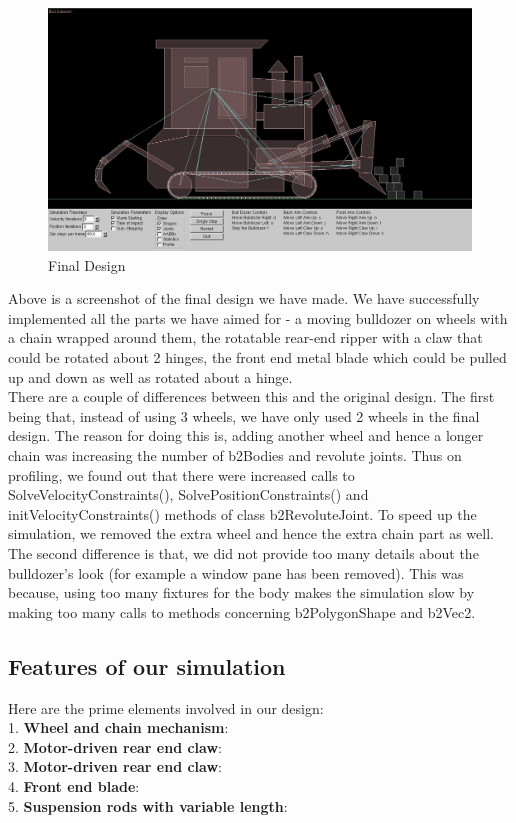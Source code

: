 \documentclass[11pt]{article}
\begin{document}
\begin{figure}
\centering 
\includegraphics [scale=0.3]{./images/final.jpg} 
\caption{Final Design}
\end{figure}
Above is a screenshot of the final design we have made. We have successfully implemented all the parts we have aimed for - a moving bulldozer on wheels with a chain wrapped around them, the rotatable rear-end ripper with a claw that could be rotated about 2 hinges, the front end metal blade which could be pulled up and down as well as rotated about a hinge. \\
There are a couple of differences between this and the original design. The first being that, instead of using 3 wheels, we have only used 2 wheels in the final design. The reason for doing this is, adding another wheel and hence a longer chain was increasing the number of b2Bodies and revolute joints. Thus on profiling, we found out that there were increased calls to SolveVelocityConstraints(), SolvePositionConstraints() and initVelocityConstraints() methods of class b2RevoluteJoint. To speed up the simulation, we removed the extra wheel and hence the extra chain part as well. The second difference is that, we did not provide too many details about the bulldozer's look (for example a window pane has been removed). This was because, using too many fixtures for the body makes the simulation slow by making too many calls to methods concerning b2PolygonShape and b2Vec2. 

\subsection{Features of our simulation}
Here are the prime elements involved in our design: \\
1. \textbf{Wheel and chain mechanism}: \\
2. \textbf{Motor-driven rear end claw}: \\
3. \textbf{Motor-driven rear end claw}: \\
4. \textbf{Front end blade}: \\
5. \textbf{Suspension rods with variable length}: \\
\end{document}
